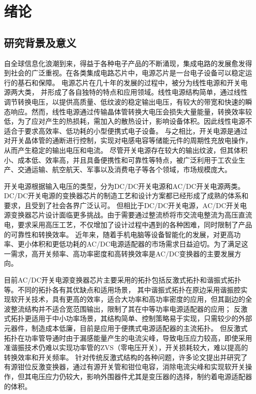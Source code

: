 \chapter{绪论}

\section{研究背景及意义}


自全球信息化浪潮到来，得益于各种电子产品的不断涌现，集成电路的发展愈发得到社会的广泛重视。在各类集成电路芯片中，电源芯片是一台电子设备可以稳定运行的基石和保障。
电源芯片在几十年的发展的过程中，被分为线性电源和开关电源两大类，
并形成了各自独特的特点和应用领域。线性电源结构简单，通过线性调节转换电压，以提供高质量、低纹波的稳定输出电压，有较大的带宽和快速的瞬态响应。然而，线性电源通过传输晶体管转换大电压会损失大量能量，转换效率较低，为了应对产生的热损耗，需加入的散热设计，影响设备体积。因此线性电源不适合于要求高效率、低功耗的小型便携式电子设备。
与之相比，开关电源是通过对开关晶体管的通断进行控制，实现对电感电容等储能元件的周期性充放电操作，从而产生稳定的输出电压和电流。
尽管开关电源存在较大的输出纹波，但其体积小、成本低、效率高，并且具备便携性和可靠性等特点，被广泛利用于工农业生产、交通运输、航空航天、军事以及消费电子等各个领域，市场规模庞大\cite{shen2012,ic_power_management_book}。

开关电源根据输入电压的类型，分为DC/DC开关电源和AC/DC开关电源两类\cite{lee2015soft,mohammed2021state,halim2019study}。
DC/DC开关电源的变换器芯片的制造工艺和设计方案都已经形成了成熟的体系和要求，且受到了社会各界广泛认可。
但相比于DC/DC开关电源，AC/DC开关电源变换器芯片设计面临更多挑战。由于需要通过整流桥将市交流电整流为高压直流电，要求采用高压工艺，不仅增加了设计过程中遇到的各种困难，同时限制了产品的可靠性和转换效率。
近年来，随着手机电脑等设备智能化的发展，对更高功率、更小体积和更低功耗的AC/DC电源适配器的市场需求日益迫切。为了满足这一需求，高开关频率、高功率密度和高转换效率是AC/DC变换器的主要发展方向。

目前AC/DC开关电源变换器芯片主要采用的拓扑包括反激式拓扑和谐振式拓扑等。不同的拓扑各有其优缺点和适用场景，
其中谐振式拓扑在原边采用谐振腔实现软开关技术，具有更高的效率，适合大功率和高功率密度的应用，但其副边的全波整流结构并不适合宽范围输出，限制了其在中等功率电源适配器的应用\cite{hu2013,zhang2004}；
反激式拓扑更适用于中小功率场景，其结构简单、控制策略易于实现，只需较少的外部元器件，制造成本低廉，目前是应用于便携式电源适配器的主流拓扑。
但反激式拓扑在功率管导通时由于漏感能量产生的电流尖峰，导致电压应力较高，即使采用准谐振技术仍难以实现功率管的ZVS（零电压开关），开关损耗较大，难以提高的转换效率和开关频率\cite{li2019analysis}。
针对传统反激式结构的各种问题，许多论文\cite{spiazzi2011high,tarzamni2016full,huang2016design}提出并研究了有源钳位反激变换器，通过有源开关管和钳位电容，消除电流尖峰和实现软开关操作，但其电压应力仍较大，影响外围器件尤其是变压器的选择，制约着电源适配器的体积。

